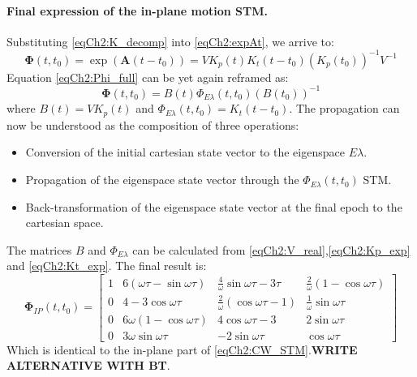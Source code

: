 		\paragraph{ Final expression of the in-plane motion STM. \\}
		\indent Substituting \eqref{eqCh2:K_decomp} into \eqref{eqCh2:expAt}, we arrive to:
		\begin{equation}
		\bm \Phi(t, t_0) = \exp \left(\bm A (t - t_0)\right) = V K_p(t) K_t(t - t_0) \left(K_p(t_0)\right)^{-1} V^{-1}
		\label{eqCh2:Phi_full}
		\end{equation}
		\indent Equation \eqref{eqCh2:Phi_full} can be yet again reframed as:
		\begin{equation}
		\bm \Phi(t, t_0) = B(t) \Phi_{E\lambda} (t, t_0) \left(B(t_0)\right)^{-1}
		\label{eqCh2:Phi_full_V2}
		\end{equation}
		\noindent where $B(t) = V K_p(t)$ and $\Phi_{E\lambda} (t, t_0) = K_t(t - t_0)$. The propagation can now be understood as the composition of three operations:
		\begin{itemize}
		\item[\GMVred{\nth{1}}] Conversion of the initial cartesian state vector to the eigenspace $E\lambda$.
		\item[\GMVred{\nth{2}}] Propagation of the eigenspace state vector through the $\Phi_{E\lambda} (t, t_0)$ STM.
		\item[\GMVred{\nth{3}}] Back-transformation of the eigenspace state vector at the final epoch to the cartesian space.
		\end{itemize}
		\indent The matrices $B$ and $\Phi_{E\lambda}$ can be calculated from \eqref{eqCh2:V_real},\eqref{eqCh2:Kp_exp} and \eqref{eqCh2:Kt_exp}. The final result is:
		\begin{equation}
		\bm \Phi_{IP} (t, t_0) = \left[
		\begin{array}{cccc}
		1	& 6(\omega\tau - \sin\omega\tau)	& \frac{4}{\omega} \sin\omega\tau - 3\tau	& \frac{2}{\omega} (1 - \cos\omega\tau) \\
		0	& 4 - 3 \cos\omega\tau				& \frac{2}{\omega} (\cos\omega\tau - 1)		& \frac{1}{\omega} \sin\omega\tau\\
		0	& 6\omega (1 - \cos\omega\tau)		& 4\cos\omega\tau - 3						& 2\sin\omega\tau	\\
		0	& 3\omega\sin\omega\tau 			& -2 \sin\omega\tau							& \cos\omega\tau
		\end{array}\right]
		\label{eqCh2:phi_IP}
		\end{equation}
		\indent Which is identical to the in-plane part of \eqref{eqCh2:CW_STM}.\textbf{WRITE ALTERNATIVE WITH BT}. 
